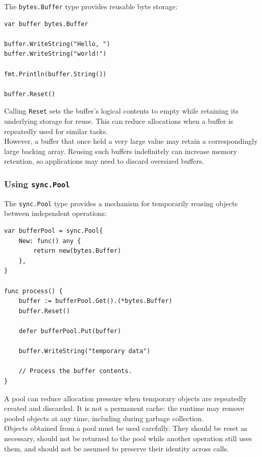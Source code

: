 The \texttt{bytes.Buffer} type provides reusable byte storage:

\begin{lstlisting}
var buffer bytes.Buffer

buffer.WriteString("Hello, ")
buffer.WriteString("world!")

fmt.Println(buffer.String())

buffer.Reset()
\end{lstlisting}

Calling \texttt{Reset} sets the buffer's logical contents to empty while retaining its underlying storage for reuse. This can reduce allocations when a buffer is repeatedly used for similar tasks.\\

However, a buffer that once held a very large value may retain a correspondingly large backing array. Reusing such buffers indefinitely can increase memory retention, so applications may need to discard oversized buffers.\\

\subsubsection{Using \texttt{sync.Pool}}

The \texttt{sync.Pool} type provides a mechanism for temporarily reusing objects between independent operations:

\begin{lstlisting}
var bufferPool = sync.Pool{
    New: func() any {
        return new(bytes.Buffer)
    },
}

func process() {
    buffer := bufferPool.Get().(*bytes.Buffer)
    buffer.Reset()

    defer bufferPool.Put(buffer)

    buffer.WriteString("temporary data")

    // Process the buffer contents.
}
\end{lstlisting}

A pool can reduce allocation pressure when temporary objects are repeatedly created and discarded. It is not a permanent cache: the runtime may remove pooled objects at any time, including during garbage collection.\\

Objects obtained from a pool must be used carefully. They should be reset as necessary, should not be returned to the pool while another operation still uses them, and should not be assumed to preserve their identity across calls.\\

